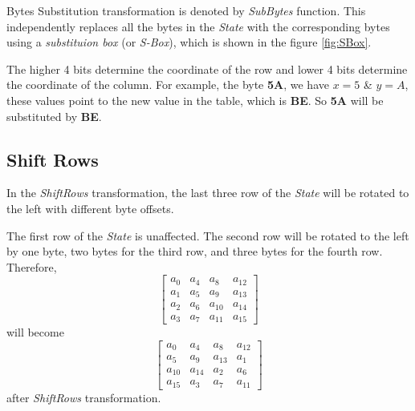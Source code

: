 \documentclass[a4paper, 10pt]{article}
\begin{document}
\begin{multicols}{2}
            Bytes Substitution transformation is denoted by \textit{SubBytes} function. This independently replaces all the bytes in the \textit{State} with the corresponding bytes using a \textit{substituion box} (or \textit{S-Box}), which is shown in the figure \ref{fig:SBox}.

            The higher 4 bits determine the coordinate of the row and lower 4 bits determine the coordinate of the column. For example, the byte \textbf{5A}, we have $x=5$ \& $y=A$, these values point to the new value in the table, which is \textbf{BE}. So \textbf{5A} will be substituted by \textbf{BE}.

            \subsection{Shift Rows}

            In the \textit{ShiftRows} transformation, the last three row of the \textit{State} will be rotated to the left with different byte offsets.

            The first row of the \textit{State} is unaffected. The second row will be rotated to the left by one byte, two bytes for the third row, and three bytes for the fourth row. Therefore,
            \begin{equation}
                \begin{bmatrix}
                    a_{0} & a_{4} & a_{8} & a_{12}\\
                    a_{1} & a_{5} & a_{9} & a_{13}\\
                    a_{2} & a_{6} & a_{10} & a_{14}\\
                    a_{3} & a_{7} & a_{11} & a_{15}
                \end{bmatrix}
            \end{equation}
            will become
            \begin{equation}
                \begin{bmatrix}
                    a_{0} & a_{4} & a_{8} & a_{12}\\
                    a_{5} & a_{9} & a_{13} & a_{1}\\
                    a_{10} & a_{14} & a_{2} & a_{6}\\
                    a_{15} & a_{3} & a_{7} & a_{11}
                \end{bmatrix}
            \end{equation}
            after \textit{ShiftRows} transformation.


\end{multicols}
\end{document}
